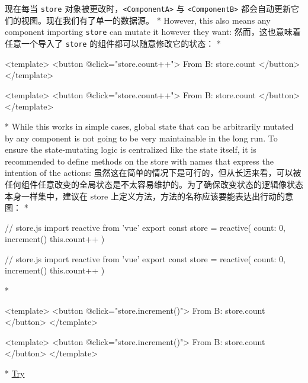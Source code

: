 \begin{paracol}{2}
\switchcolumn
现在每当 \texttt{store}
对象被更改时，\texttt{\textless{}ComponentA\textgreater{}} 与
\texttt{\textless{}ComponentB\textgreater{}}
都会自动更新它们的视图。现在我们有了单一的数据源。
\switchcolumn[0]*%
However, this also means any component importing \texttt{store} can
mutate it however they want:
\switchcolumn
然而，这也意味着任意一个导入了 \texttt{store}
的组件都可以随意修改它的状态：
\switchcolumn[0]*%
\begin{codeHtml}
<template>
  <button @click="store.count++">
    From B: {{ store.count }}
  </button>
</template>
\end{codeHtml}
\switchcolumn
\begin{codeHtml}
<template>
  <button @click="store.count++">
    From B: {{ store.count }}
  </button>
</template>
\end{codeHtml}
\switchcolumn[0]*%
While this works in simple cases, global state that can be arbitrarily
mutated by any component is not going to be very maintainable in the
long run. To ensure the state-mutating logic is centralized like the
state itself, it is recommended to define methods on the store with
names that express the intention of the actions:
\switchcolumn
虽然这在简单的情况下是可行的，但从长远来看，可以被任何组件任意改变的全局状态是不太容易维护的。为了确保改变状态的逻辑像状态本身一样集中，建议在
store 上定义方法，方法的名称应该要能表达出行动的意图：
\switchcolumn[0]*%
\begin{codeJs}
// store.js
import { reactive } from 'vue'
export const store = reactive({
  count: 0,
  increment() {
    this.count++
  }
})
\end{codeJs}
\switchcolumn
\begin{codeJs}
// store.js
import { reactive } from 'vue'
export const store = reactive({
  count: 0,
  increment() {
    this.count++
  }
})
\end{codeJs}
\switchcolumn[0]*%
\begin{codeHtml}
<template>
  <button @click="store.increment()">
    From B: {{ store.count }}
  </button>
</template>
\end{codeHtml}
\switchcolumn
\begin{codeHtml}
<template>
  <button @click="store.increment()">
    From B: {{ store.count }}
  </button>
</template>
\end{codeHtml}
\switchcolumn[0]*%
\href{https://play.vuejs.org/\#eNrNkk1uwyAQha8yYpNEiUzXllPVrtRTeJNSqtLGgGBsVbK4ewdwnT9FWWSTFczwmPc+xMhqa4uhl6xklRdOWQQvsbfPrVadNQ7h1dCqpcYaPp3pYFHwQyteXVxKm0tpM0krnm3IgAqUnd3vUFIFUB1Z8bNOkzoVny+wDTuNcZ1gBI/GSQhzqlQX3/5Gng81pA1t33tEo+FF7JX42bYsT1BaONlRguWqZZMU4C261CWMk3EhTK8RQphm8Twse/BscoUsvdqDkTX3kP3nI6aZwcmdQDUcMPJPabX8TQphtCf0RLqd1csxuqQAJTxtYnEUGtIpAH4pn1Ou17FDScOKhT+QNAVM}{Try
}
\end{paracol}
